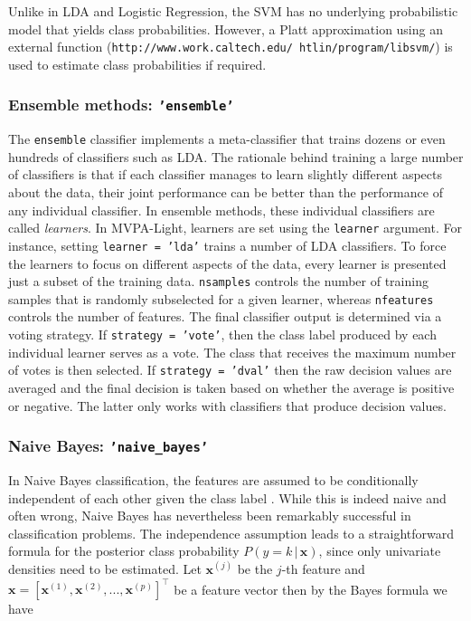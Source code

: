 \documentclass[utf8]{frontiersSCNS} %
\newcommand{\x}{\mathbf{x}}
\newcommand{\xf}[1]{\mathbf{x}^{(#1)}} %
\newcommand{\ttt}[1]{\texttt{#1}}
\begin{document}
Unlike in LDA and Logistic Regression, the SVM has no underlying probabilistic model that yields class probabilities. However, a Platt approximation using an external function (\ttt{http://www.work.caltech.edu/~htlin/program/libsvm/}) is used to estimate class probabilities if required.


\subsubsection{Ensemble methods: \ttt{'ensemble'}}

The \ttt{ensemble} classifier implements a meta-classifier that trains dozens
or even hundreds of classifiers such as LDA. The rationale behind training a large number of classifiers is that if each classifier manages to learn slightly different aspects about the data, their joint performance can be better than the performance of any individual classifier.
In ensemble methods, these individual classifiers are called \textit{learners}. In MVPA-Light, learners are set using the \ttt{learner} argument. For instance, setting \ttt{learner = 'lda'} trains a number of LDA classifiers. To force the learners to focus on different aspects of the data, every learner is presented just a subset of the training data. \ttt{nsamples} controls the number of training samples that is randomly subselected for a given learner, whereas \ttt{nfeatures} controls the number of features.
The final classifier output is determined via a voting strategy. If \ttt{strategy = 'vote'}, then the class label produced by each individual learner serves as a vote. The class that receives the maximum number of votes is then selected. If \ttt{strategy = 'dval'}  then the raw decision values are averaged and the final decision is taken based on whether the average is positive or negative. The latter only works with classifiers that produce decision values.

\subsubsection{Naive Bayes: \ttt{'naive\_bayes'}}

In Naive Bayes classification, the features are assumed to be conditionally independent of each other given the class label \citep{Bishop2007}. While this is indeed naive and often wrong, Naive Bayes has nevertheless been remarkably successful in classification problems. The independence assumption leads to a straightforward formula for the posterior class probability $P(y = k\,|\,\x)$, since only univariate densities need to be estimated. Let $\xf{j}$ be the $j$-th feature and $\x = [\xf{1}, \xf{2}, ..., \xf{p}]^\top$ be a feature vector then by the Bayes formula we have
\end{document}
